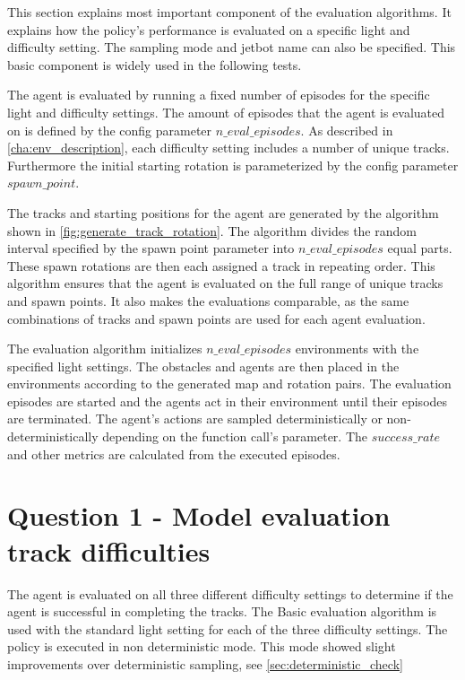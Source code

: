This section explains most important component of the evaluation algorithms. It explains how the policy's performance is evaluated on a specific light and difficulty setting. The sampling mode and jetbot name can also be specified. This basic component is widely used in the following tests.

The agent is evaluated by running a fixed number of episodes for the specific light and difficulty settings. The amount of episodes that the agent is evaluated on is defined by the config parameter $n\_eval\_episodes$. As described in \ref{cha:env_description}, each difficulty setting includes a number of unique tracks. Furthermore the initial starting rotation is parameterized by the config parameter $spawn\_point$.

The tracks and starting positions for the agent are generated by the algorithm shown in \ref{fig:generate_track_rotation}. The algorithm divides the random interval specified by the spawn point parameter into $n\_eval\_episodes$ equal parts. These spawn rotations are then each assigned a track in repeating order.
This algorithm ensures that the agent is evaluated on the full range of unique tracks and spawn points.
It also makes the evaluations comparable, as the same combinations of tracks and spawn points are used for each agent evaluation.

The evaluation algorithm initializes $n\_eval\_episodes$ environments with the specified light settings. The obstacles and agents are then placed in the environments according to the generated map and rotation pairs. The evaluation episodes are started and the agents act in their environment until their episodes are terminated. The agent's actions are sampled deterministically or non-deterministically depending on the function call's parameter.
The $success\_rate$ and other metrics are calculated from the executed episodes.


\section{Question 1 - Model evaluation track difficulties}

The agent is evaluated on all three different difficulty settings to determine if the agent is successful in completing the tracks.
The Basic evaluation algorithm is used with the standard light setting for each of the three difficulty settings.
The policy is executed in non deterministic mode. This mode showed slight improvements over deterministic sampling, see \ref{sec:deterministic_check}




